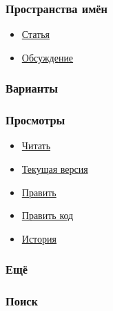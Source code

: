 \documentclass[a4paper,11pt]{article}
\begin{document}
\subsubsection{Пространства имён}
\begin{itemize}
	\item \href{https://ru.wikipedia.org/wiki/Xeon}{Статья}
	\item \href{https://ru.wikipedia.org/wiki/%D0%9E%D0%B1%D1%81%D1%83%D0%B6%D0%B4%D0%B5%D0%BD%D0%B8%D0%B5:Xeon}{Обсуждение}
\end{itemize}

\subsubsection{Варианты}
\begin{itemize}
\end{itemize}

\subsubsection{Просмотры}
\begin{itemize}
	\item \href{https://ru.wikipedia.org/w/index.php?title=Xeon&amp;stable=1}{Читать}
	\item \href{https://ru.wikipedia.org/w/index.php?title=Xeon&amp;stable=0&amp;redirect=no}{Текущая версия}
	\item \href{https://ru.wikipedia.org/w/index.php?title=Xeon&amp;veaction=edit}{Править}
	\item \href{https://ru.wikipedia.org/w/index.php?title=Xeon&amp;action=edit}{Править код}
	\item \href{https://ru.wikipedia.org/w/index.php?title=Xeon&amp;action=history}{История}
\end{itemize}

\subsubsection{Ещё}
\begin{itemize}
\end{itemize}

\subsubsection{Поиск}\href{https://ru.wikipedia.org/wiki/%D0%97%D0%B0%D0%B3%D0%BB%D0%B0%D0%B2%D0%BD%D0%B0%D1%8F_%D1%81%D1%82%D1%80%D0%B0%D0%BD%D0%B8%D1%86%D0%B0}{}
\end{document}
